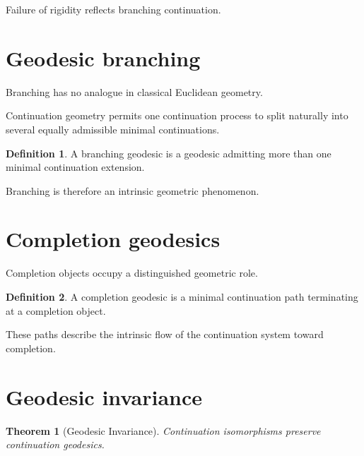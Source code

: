 \documentclass[13pt,openany]{book}
\theoremstyle{plain}
\newtheorem{theorem}{Theorem}[chapter]
\theoremstyle{definition}
\newtheorem{definition}{Definition}[chapter]
\begin{document}
Failure of rigidity reflects branching continuation.


\section{Geodesic branching}

Branching has no analogue in classical Euclidean geometry.

Continuation geometry permits one continuation process to split naturally into several equally admissible minimal continuations.

\begin{definition}

A branching geodesic is a geodesic admitting more than one minimal continuation extension.

\end{definition}

Branching is therefore an intrinsic geometric phenomenon.


\section{Completion geodesics}

Completion objects occupy a distinguished geometric role.

\begin{definition}

A completion geodesic is a minimal continuation path terminating at a completion object.

\end{definition}

These paths describe the intrinsic flow of the continuation system toward completion.


\section{Geodesic invariance}

\begin{theorem}[Geodesic Invariance]

Continuation isomorphisms preserve continuation geodesics.

\end{theorem}
\end{document}

